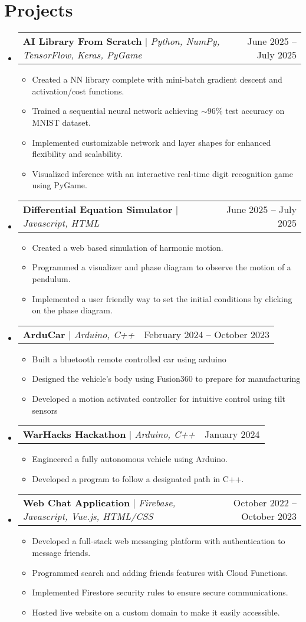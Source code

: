 \documentclass[letterpaper,11pt]{article}
\makeatletter
\newcommand{\resumeItem}[1]{
  \item\small{
    {#1 \vspace{-2pt}}
  }
}
\newcommand{\resumeProjectHeading}[2]{
    \item
    \begin{tabular*}{0.97\textwidth}{l@{\extracolsep{\fill}}r}
      \small#1 & #2 \\
    \end{tabular*}\vspace{-7pt}
}
\newcommand{\resumeSubHeadingListStart}{\begin{itemize}[leftmargin=0.15in, label={}]}
\newcommand{\resumeSubHeadingListEnd}{\end{itemize}}
\newcommand{\resumeItemListStart}{\begin{itemize}}
\newcommand{\resumeItemListEnd}{\end{itemize}\vspace{-5pt}}
\makeatother
\begin{document}
\section{Projects}
    \resumeSubHeadingListStart
      \resumeProjectHeading
          {\textbf{AI Library From Scratch} $|$ \emph{Python, NumPy, TensorFlow, Keras, PyGame}}{June 2025 -- July 2025}
          \resumeItemListStart
            \resumeItem{Created a NN library complete with mini-batch gradient descent and activation/cost functions.}
            \resumeItem{Trained a sequential neural network achieving $\sim$96\% test accuracy on MNIST dataset.}
            \resumeItem{Implemented customizable network and layer shapes for enhanced flexibility and scalability.}
            \resumeItem{Visualized inference with an interactive real-time digit recognition game using PyGame.}
          \resumeItemListEnd
      \resumeProjectHeading
          {\textbf{Differential Equation Simulator} $|$ \emph{Javascript, HTML}}{June 2025 -- July 2025}
          \resumeItemListStart
            \resumeItem{Created a web based simulation of harmonic motion.}
            \resumeItem{Programmed a visualizer and phase diagram to observe the motion of a pendulum.}
            \resumeItem{Implemented a user friendly way to set the initial conditions by clicking on the phase diagram.}
          \resumeItemListEnd
      \resumeProjectHeading
          {\textbf{ArduCar} $|$ \emph{Arduino, C++}}{February 2024 -- October 2023}
          \resumeItemListStart
            \resumeItem{Built a bluetooth remote controlled car using arduino}
            \resumeItem{Designed the vehicle's body using Fusion360 to prepare for manufacturing}
            \resumeItem{Developed a motion activated controller for intuitive control using tilt sensors}
          \resumeItemListEnd
      \resumeProjectHeading
          {\textbf{WarHacks Hackathon} $|$ \emph{Arduino, C++}}{January 2024}
          \resumeItemListStart
            \resumeItem{Engineered a fully autonomous vehicle using Arduino.}
            \resumeItem{Developed a program to follow a designated path in C++.}
          \resumeItemListEnd
      \resumeProjectHeading
          {\textbf{Web Chat Application} $|$ \emph{Firebase, Javascript, Vue.js, HTML/CSS}}{October 2022 -- October 2023}
          \resumeItemListStart
            \resumeItem{Developed a full-stack web messaging platform with authentication to message friends.}
            \resumeItem{Programmed search and adding friends features with Cloud Functions.}
            \resumeItem{Implemented Firestore security rules to ensure secure communications.}
            \resumeItem{Hosted live website on a custom domain to make it easily accessible.}
          \resumeItemListEnd
    \resumeSubHeadingListEnd
\end{document}
